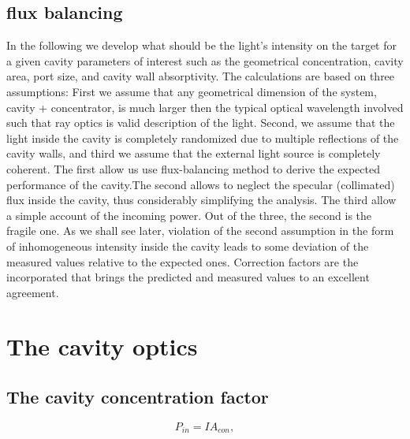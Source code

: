 \documentclass[a4paper]{article}
\begin{document}

\subsection{flux balancing}
In the following we develop what should be the light’s intensity on the target for a given cavity parameters of interest such as the geometrical concentration, cavity area, port size, and cavity wall absorptivity. The calculations are based on three assumptions: First we assume that any geometrical dimension of the system, cavity + concentrator, is much larger then the typical optical wavelength involved such that ray optics is valid description of the light. Second, we assume that the light inside the cavity is completely randomized due to multiple reflections of the cavity walls, and third we assume that the external light source is completely coherent. The first allow us use flux-balancing method to derive the expected performance of the cavity.The second allows to neglect the specular (collimated) flux inside the cavity, thus considerably simplifying the analysis. The third allow a simple account of the incoming power. Out of the three, the second is the fragile one. As we shall see later, violation of the second assumption in the form of inhomogeneous intensity inside the cavity leads to some deviation of the measured values relative to the expected ones. Correction factors are the incorporated that brings the predicted and measured values to an excellent agreement.



\section{The cavity optics}\label{sec2}

\subsection{The cavity concentration factor}


\begin{equation}\label{eq1}
P_{in}=IA_{con},
\end{equation}
\end{document}

